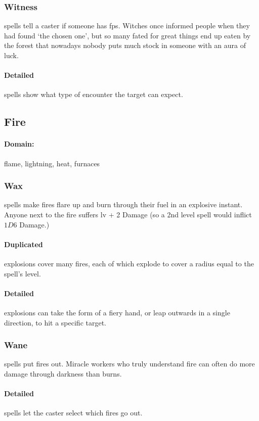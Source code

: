 \begin{multicols}{2}
\subsubsection{Witness}
spells tell a caster if someone has \glspl{fp}.
Witches once informed people when they had found `the chosen one', but so many fated for great things end up eaten by the forest that nowadays nobody puts much stock in someone with an aura of luck.

\paragraph{Detailed}
spells show what type of encounter the target can expect.

\subsection{Fire}
\paragraph{Domain:}
flame, lightning, heat, furnaces

\subsubsection{Wax}
spells make fires flare up and burn through their fuel in an explosive instant.
Anyone next to the fire suffers \gls{lv} + 2 Damage (so a 2nd level spell would inflict $1D6$ Damage.)

\paragraph{Duplicated}
explosions cover many fires, each of which explode to cover a radius equal to the spell's level.

\paragraph{Detailed}
explosions can take the form of a fiery hand, or leap outwards in a single direction, to hit a specific target.

\subsubsection{Wane}
spells put fires out.
Miracle workers who truly understand fire can often do more damage through darkness than burns.

\paragraph{Detailed}
spells let the caster select which fires go out.


\end{multicols}
